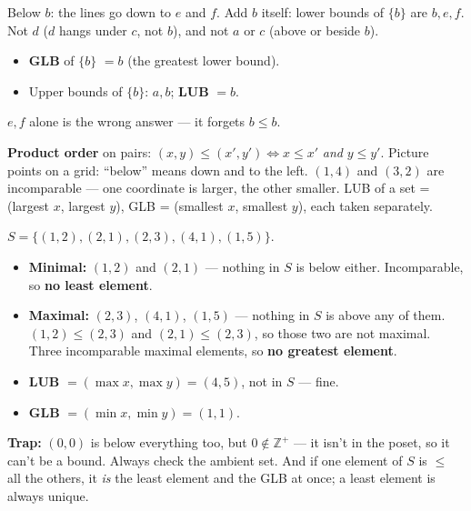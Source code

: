 \documentclass{fkt-notes}
\theoremstyle{definition}
\begin{document}
\begin{example}
  \leavevmode\par\noindent
  \begin{minipage}[c]{0.28\textwidth}
    \centering
  \end{minipage}\hfill
  \begin{minipage}[c]{0.7\textwidth}
    Below $b$: the lines go down to $e$ and $f$. Add $b$ itself:
    lower bounds of $\{b\}$ are \textbf{$b, e, f$}. Not $d$ ($d$ hangs
    under $c$, not $b$), and not $a$ or $c$ (above or beside $b$).
    \begin{itemize}[nosep]
      \item \textbf{GLB} of $\{b\}$ $= b$ (the greatest lower bound).
      \item Upper bounds of $\{b\}$: $a, b$; \textbf{LUB} $= b$.
    \end{itemize}
    $e, f$ alone is the wrong answer --- it forgets $b \le b$.
  \end{minipage}
\end{example}

\textbf{Product order} on pairs: $(x,y) \le (x',y') \iff x \le x'$
\emph{and} $y \le y'$. Picture points on a grid: ``below'' means down
and to the left. $(1,4)$ and $(3,2)$ are incomparable --- one coordinate
is larger, the other smaller. LUB of a set = (largest $x$, largest $y$),
GLB = (smallest $x$, smallest $y$), each taken separately.
%

\begin{example}
  $S = \{(1,2), (2,1), (2,3), (4,1), (1,5)\}$.
  \begin{itemize}[nosep]
    \item \textbf{Minimal:} $(1,2)$ and $(2,1)$ --- nothing in $S$ is
          below either. Incomparable, so \textbf{no least element}.
    \item \textbf{Maximal:} $(2,3)$, $(4,1)$, $(1,5)$ --- nothing in $S$
          is above any of them. $(1,2) \le (2,3)$ and $(2,1) \le (2,3)$,
          so those two are not maximal. Three incomparable maximal
          elements, so \textbf{no greatest element}.
    \item \textbf{LUB} $= (\max x, \max y) = (4, 5)$, not in $S$ --- fine.
    \item \textbf{GLB} $= (\min x, \min y) = (1, 1)$.
  \end{itemize}
  \textbf{Trap:} $(0,0)$ is below everything too, but $0 \notin
    \mathbb{Z}^+$ --- it isn't in the poset, so it can't be a bound. Always
  check the ambient set. And if one element of $S$ is $\le$ all the
  others, it \emph{is} the least element and the GLB at once; a least
  element is always unique.
\end{example}
\end{document}
